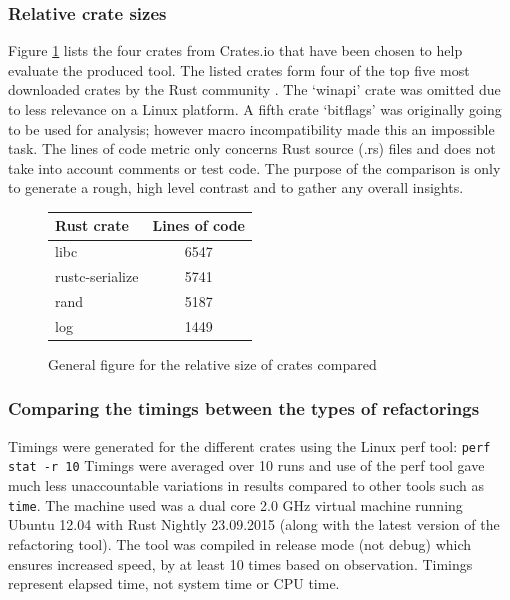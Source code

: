 \subsubsection{Relative crate sizes}
Figure \ref{Fig:codesize} lists the four crates from Crates.io that have been chosen to help evaluate the produced tool. The listed crates form four of the top five most downloaded crates by the Rust community \cite{cratesio15}. The `winapi' crate was omitted due to less relevance on a Linux platform. A fifth crate `bitflags' was originally going to be used for analysis; however macro incompatibility made this an impossible task. The lines of code metric only concerns Rust source (.rs) files and does not take into account comments or test code. The purpose of the comparison is only to generate a rough, high level contrast and to gather any overall insights. 

\begin{figure}[h]
\begin{center}
    \begin{tabular}{ | l | c |}
    \hline
    \textbf{Rust crate} & \textbf{Lines of code} \\ \hline
    libc & 6547 \\ \hline
    rustc-serialize &  5741 \\ \hline
    rand &   5187 \\ \hline
    log &  1449 \\ \hline
    \end{tabular}
\end{center}

\caption{General figure for the relative size of crates compared}
\label{Fig:codesize}
\end{figure}


\subsubsection{Comparing the timings between the types of refactorings}
Timings were generated for the different crates using the Linux perf tool: {\verb|perf stat -r 10|} Timings were averaged over 10 runs and use of the perf tool gave much less unaccountable variations in results compared to other tools such as {\verb|time|}. The machine used was a dual core 2.0 GHz virtual machine running Ubuntu 12.04 with Rust Nightly 23.09.2015 (along with the latest version of the refactoring tool). The tool was compiled in release mode (not debug) which ensures increased speed, by at least 10 times based on observation. Timings represent elapsed time, not system time or CPU time.

